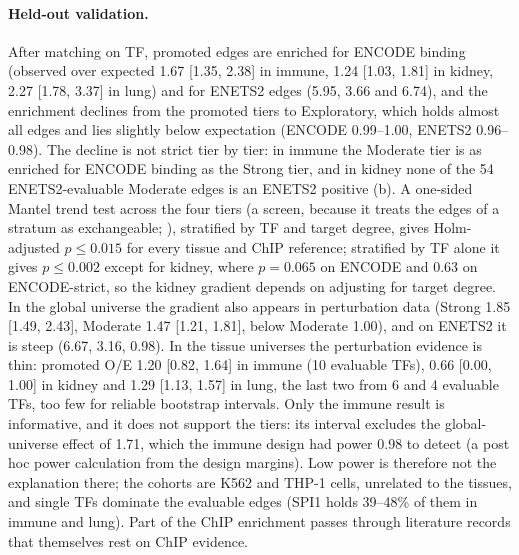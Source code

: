 \documentclass[11pt,a4paper]{article}
\begin{document}
\paragraph{Held-out validation.}
After matching on TF, promoted edges are enriched for ENCODE binding (observed over expected 1.67 [1.35, 2.38] in immune, 1.24 [1.03, 1.81] in kidney, 2.27 [1.78, 3.37] in lung) and for ENETS2 edges (5.95, 3.66 and 6.74), and the enrichment declines from the promoted tiers to Exploratory, which holds almost all edges and lies slightly below expectation (ENCODE 0.99--1.00, ENETS2 0.96--0.98). The decline is not strict tier by tier: in immune the Moderate tier is as enriched for ENCODE binding as the Strong tier, and in kidney none of the 54 ENETS2-evaluable Moderate edges is an ENETS2 positive (b).
A one-sided Mantel trend test across the four tiers (a screen, because it treats the edges of a stratum as exchangeable; ), stratified by TF and target degree, gives Holm-adjusted $p\le 0.015$ for every tissue and ChIP reference; stratified by TF alone it gives $p\le0.002$ except for kidney, where $p=0.065$ on ENCODE and 0.63 on ENCODE-strict, so the kidney gradient depends on adjusting for target degree.
In the global universe the gradient also appears in perturbation data (Strong 1.85 [1.49, 2.43], Moderate 1.47 [1.21, 1.81], below Moderate 1.00), and on ENETS2 it is steep (6.67, 3.16, 0.98).
In the tissue universes the perturbation evidence is thin: promoted O/E 1.20 [0.82, 1.64] in immune (10 evaluable TFs), 0.66 [0.00, 1.00] in kidney and 1.29 [1.13, 1.57] in lung, the last two from 6 and 4 evaluable TFs, too few for reliable bootstrap intervals.
Only the immune result is informative, and it does not support the tiers: its interval excludes the global-universe effect of 1.71, which the immune design had power 0.98 to detect (a post hoc power calculation from the design margins).
Low power is therefore not the explanation there; the cohorts are K562 and THP-1 cells, unrelated to the tissues, and single TFs dominate the evaluable edges (SPI1 holds 39--48\% of them in immune and lung).
Part of the ChIP enrichment passes through literature records that themselves rest on ChIP evidence.
\end{document}

